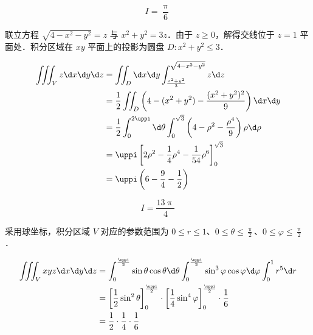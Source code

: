 \begin{solution}
    \begin{equation}
        I = \boxed{\frac{\uppi}{6}}
    \end{equation}

    联立方程 $\sqrt{4-x^{2}-y^{2}}=z$ 与 $x^{2}+y^{2}=3 z$．由于 $z \geqslant 0$，解得交线位于 $z=1$ 平面处．积分区域在 $xy$ 平面上的投影为圆盘 $D: x^2+y^2 \leqslant 3$．

    \begin{equation}
        \begin{aligned}
            \iiint_{V} z \d x \d y \d z & = \iint_{D} \d x \d y \int_{\frac{x^2+y^2}{3}}^{\sqrt{4-x^2-y^2}} z \d z                                                 \\
                                        & = \frac{1}{2} \iint_{D} \left( 4 - (x^2 + y^2) - \frac{(x^2+y^2)^2}{9} \right) \d x \d y                                 \\
                                        & = \frac{1}{2} \int_{0}^{2 \uppi} \d \theta \int_{0}^{\sqrt{3}} \left( 4 - \rho^2 - \frac{\rho^4}{9} \right) \rho \d \rho \\
                                        & = \uppi \left[ 2 \rho^2 - \frac{1}{4} \rho^4 - \frac{1}{54} \rho^6 \right]_{0}^{\sqrt{3}}                                \\
                                        & = \uppi \left( 6 - \frac{9}{4} - \frac{1}{2} \right) \label{eq:I3}
        \end{aligned}
    \end{equation}

    \begin{equation}
        I = \boxed{\frac{13 \uppi}{4}}
    \end{equation}

    采用球坐标，积分区域 $V$ 对应的参数范围为 $0 \leqslant r \leqslant 1$、$0 \leqslant \theta \leqslant \frac{\uppi}{2}$、$0 \leqslant \varphi \leqslant \frac{\uppi}{2}$．

    \begin{equation}
        \begin{aligned}
            \iiint_{V} x y z \d x \d y \d z & = \int_{0}^{\frac{\uppi}{2}} \sin \theta \cos \theta \d \theta \int_{0}^{\frac{\uppi}{2}} \sin^3 \varphi \cos \varphi \d \varphi \int_{0}^{1} r^5 \d r   \\
                                            & = \left[ \frac{1}{2} \sin^2 \theta \right]_{0}^{\frac{\uppi}{2}} \cdot \left[ \frac{1}{4} \sin^4 \varphi \right]_{0}^{\frac{\uppi}{2}} \cdot \frac{1}{6} \\
                                            & = \frac{1}{2} \cdot \frac{1}{4} \cdot \frac{1}{6} \label{eq:I4}
        \end{aligned}
    \end{equation}


\end{solution}
